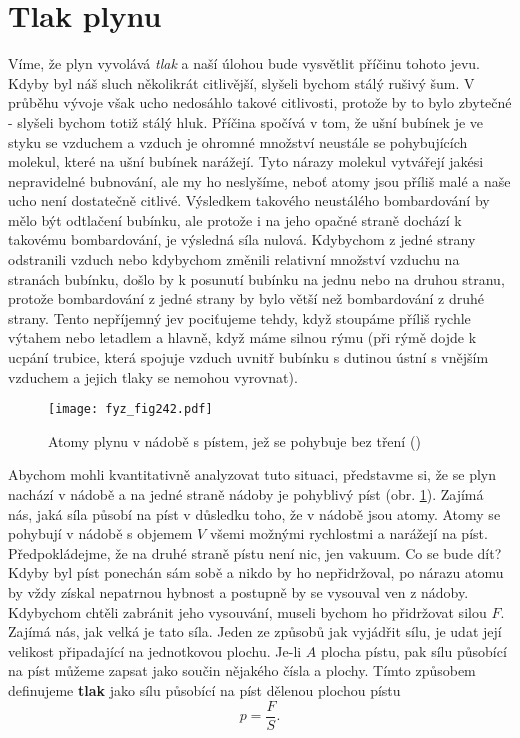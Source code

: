   \section{Tlak plynu}\label{fyz:IchapIXLsecII}
    Víme, že plyn vyvolává \emph{tlak} a naší úlohou bude vysvětlit příčinu tohoto jevu. Kdyby byl
    náš sluch několikrát citlivější, slyšeli bychom stálý rušivý šum. V průběhu vývoje však ucho
    nedosáhlo takové citlivosti, protože by to bylo zbytečné - slyšeli bychom totiž stálý hluk.
    Příčina spočívá v tom, že ušní bubínek je ve styku se vzduchem a vzduch je ohromné množství
    neustále se pohybujících molekul, které na ušní bubínek narážejí. Tyto nárazy molekul vytvářejí
    jakési nepravidelné bubnování, ale my ho neslyšíme, neboť atomy jsou příliš malé a naše ucho
    není dostatečně citlivé. Výsledkem takového neustálého bombardování by mělo být odtlačení
    bubínku, ale protože i na jeho opačné straně dochází k takovému bombardování, je výsledná síla
    nulová. Kdybychom z jedné strany odstranili vzduch nebo kdybychom změnili relativní množství
    vzduchu na stranách bubínku, došlo by k posunutí bubínku na jednu nebo na druhou stranu, protože
    bombardování z jedné strany by bylo větší než bombardování z druhé strany. Tento nepříjemný jev
    pociťujeme tehdy, když stoupáme příliš rychle výtahem nebo letadlem a hlavně, když máme silnou
    rýmu (při rýmě dojde k ucpání trubice, která spojuje vzduch uvnitř bubínku s dutinou ústní s
    vnějším vzduchem a jejich tlaky se nemohou vyrovnat).

    \begin{figure}[ht!] %
      \centering
      \texttt{[image: fyz\_fig242.pdf]}
      \caption{Atomy plynu v nádobě s pístem, jež se pohybuje bez tření (\cite[s.~525]{Feynman01})}
      \label{fyz:fig242}
    \end{figure}

    Abychom mohli kvantitativně analyzovat tuto situaci, představme si, že se plyn nachází v nádobě
    a na jedné straně nádoby je pohyblivý píst (obr. \ref{fyz:fig242}). Zajímá nás, jaká síla působí
    na píst v důsledku toho, že v nádobě jsou atomy. Atomy se pohybují v nádobě s objemem \(V\)
    všemi možnými rychlostmi a narážejí na píst. Předpokládejme, že na druhé straně pístu není nic,
    jen vakuum. Co se bude dít? Kdyby byl píst ponechán sám sobě a nikdo by ho nepřidržoval, po
    nárazu atomu by vždy získal nepatrnou hybnost a postupně by se vysouval ven z nádoby. Kdybychom
    chtěli zabránit jeho vysouvání, museli bychom ho přidržovat silou \(F\). Zajímá nás, jak velká
    je tato síla. Jeden ze způsobů jak vyjádřit sílu, je udat její velikost připadající na
    jednotkovou plochu. Je-li \(A\) plocha pístu, pak sílu působící na píst můžeme zapsat jako
    součin nějakého čísla a plochy. Tímto způsobem definujeme \textbf{tlak} jako sílu působící na
    píst dělenou plochou pístu
    \begin{equation}\label{fyz:eq613}
      p = \frac{F}{S}.
    \end{equation}

